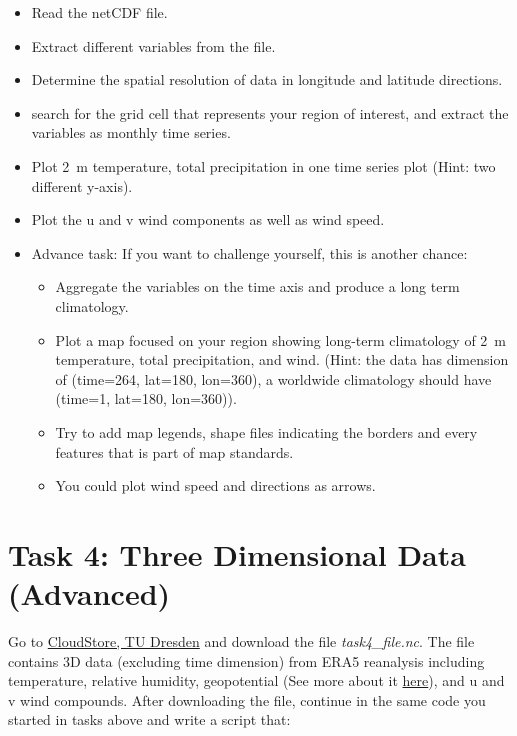 \documentclass{article}
\begin{document}
\begin{itemize}
\item Read the netCDF file.
\item Extract different variables from the file. 
\item Determine the spatial resolution of data in longitude and latitude directions. 
\item search for the grid cell that represents your region of interest, and extract the variables as monthly time series. 
\item Plot 2 m temperature, total precipitation in one time series plot (Hint: two different y-axis).
\item Plot the u and v wind components as well as wind speed. 
    
\item Advance task: If you want to challenge yourself, this is another chance: 
    \begin{itemize}
    \item Aggregate the variables on the time axis and produce a long term climatology. 
    \item Plot a map focused on your region showing long-term climatology of 2 m temperature, total precipitation, and wind. (Hint: the data has dimension of (time=264, lat=180, lon=360), a worldwide climatology should have (time=1, lat=180, lon=360)).
    \item Try to add map legends, shape files indicating the borders and every features that is part of map standards.
    \item You could plot wind speed and directions as arrows.  
    \end{itemize}
\end{itemize}



\section{Task 4: Three Dimensional Data (Advanced)}
Go to \href{https://cloudstore.zih.tu-dresden.de/index.php/s/Bks4sAZbPD46SZ7}{CloudStore, TU Dresden} and download the file \textit{task4\_file.nc}. The file contains 3D data (excluding time dimension) from ERA5 reanalysis including temperature, relative humidity, geopotential (See more about it \href{https://apps.ecmwf.int/codes/grib/param-db/?id=129}{here}), and u and v wind compounds. After downloading the file, continue in the same code you started in tasks above and write a script that: 
\end{document}
